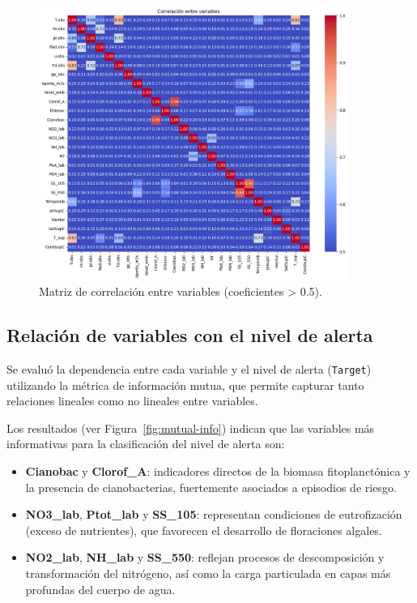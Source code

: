 \documentclass[11pt]{report}
\begin{document}
\begin{figure}[H]
    \centering
    \includegraphics[width=0.90\textwidth]{Imagenes/Correlacion_Heatmap.png}
    \caption{Matriz de correlación entre variables (coeficientes > 0.5).}
    \label{fig:correlaciones}
\end{figure}

\subsection{Relación de variables con el nivel de alerta}

Se evaluó la dependencia entre cada variable y el nivel de alerta (\texttt{Target}) utilizando la métrica de información mutua, que permite capturar tanto relaciones lineales como no lineales entre variables.

Los resultados (ver Figura~\ref{fig:mutual-info}) indican que las variables más informativas para la clasificación del nivel de alerta son:

\begin{itemize}
  \item \textbf{Cianobac} y \textbf{Clorof\_A}: indicadores directos de la biomasa fitoplanctónica y la presencia de cianobacterias, fuertemente asociados a episodios de riesgo.
  
  \item \textbf{NO3\_lab}, \textbf{Ptot\_lab} y \textbf{SS\_105}: representan condiciones de eutrofización (exceso de nutrientes), que favorecen el desarrollo de floraciones algales.
  
  \item \textbf{NO2\_lab}, \textbf{NH\_lab} y \textbf{SS\_550}: reflejan procesos de descomposición y transformación del nitrógeno, así como la carga particulada en capas más profundas del cuerpo de agua.
\end{itemize}
\end{document}
